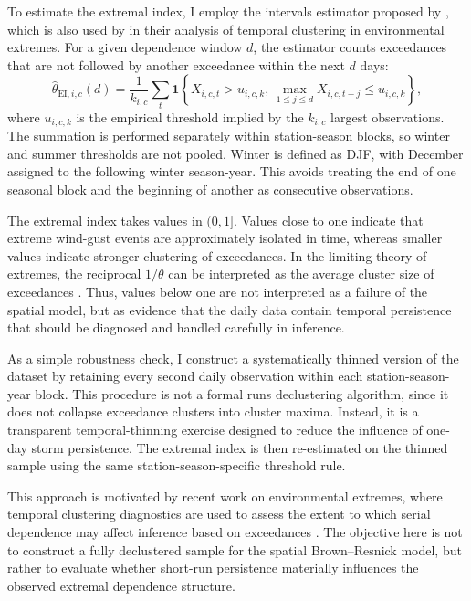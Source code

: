 To estimate the extremal index, I employ the intervals estimator proposed by \citet{FerroSegers2003}, which is also used by \citet{WangLinSchaumburg2024} in their analysis of temporal clustering in environmental extremes. For a given dependence window \(d\), the estimator counts exceedances that are not followed by another exceedance within the next \(d\) days:
\[
    \widehat{\theta}_{\mathrm{EI},i,c}(d)
    =
    \frac{1}{k_{i,c}}
    \sum_t
    \mathbf{1}
    \left\{
    X_{i,c,t} > u_{i,c,k},
    \,
    \max_{1 \leq j \leq d} X_{i,c,t+j} \leq u_{i,c,k}
    \right\},
\]
where \(u_{i,c,k}\) is the empirical threshold implied by the \(k_{i,c}\) largest observations. The summation is performed separately within station-season blocks, so winter and summer thresholds are not pooled. Winter is defined as DJF, with December assigned to the following winter season-year. This avoids treating the end of one seasonal block and the beginning of another as consecutive observations.

The extremal index takes values in \((0,1]\). Values close to one indicate that extreme wind-gust events are approximately isolated in time, whereas smaller values indicate stronger clustering of exceedances. In the limiting theory of extremes, the reciprocal \(1/\theta\) can be interpreted as the average cluster size of exceedances \citep{Leadbetter1983}. Thus, values below one are not interpreted as a failure of the spatial model, but as evidence that the daily data contain temporal persistence that should be diagnosed and handled carefully in inference.

As a simple robustness check, I construct a systematically thinned version of the dataset by retaining every second daily observation within each station-season-year block. This procedure is not a formal runs declustering algorithm, since it does not collapse exceedance clusters into cluster maxima. Instead, it is a transparent temporal-thinning exercise designed to reduce the influence of one-day storm persistence. The extremal index is then re-estimated on the thinned sample using the same station-season-specific threshold rule.

This approach is motivated by recent work on environmental extremes, where temporal clustering diagnostics are used to assess the extent to which serial dependence may affect inference based on exceedances \citep{WangLinSchaumburg2024}. The objective here is not to construct a fully declustered sample for the spatial Brown--Resnick model, but rather to evaluate whether short-run persistence materially influences the observed extremal dependence structure.

